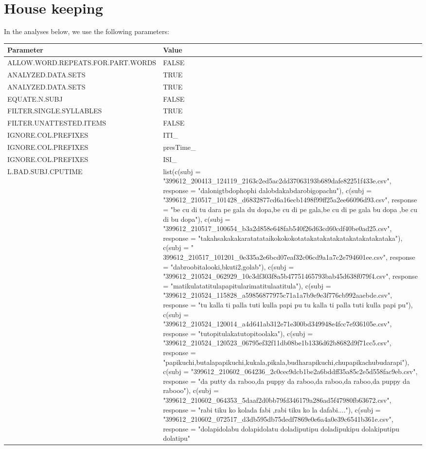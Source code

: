 \documentclass[
]{article}
\begin{document}
\section{House keeping}\label{house-keeping}

In the analyses below, we use the following parameters:

\begin{longtable}[t]{>{\raggedright\arraybackslash}p{20em}>{\raggedright\arraybackslash}p{30em}}
\toprule
Parameter & Value\\
\midrule
ALLOW.WORD.REPEATS.FOR.PART.WORDS & FALSE\\
ANALYZED.DATA.SETS & \vphantom{1} TRUE\\
ANALYZED.DATA.SETS & TRUE\\
EQUATE.N.SUBJ & FALSE\\
FILTER.SINGLE.SYLLABLES & TRUE\\
\addlinespace
FILTER.UNATTESTED.ITEMS & FALSE\\
IGNORE.COL.PREFIXES & ITI\_\\
IGNORE.COL.PREFIXES & presTime\_\\
IGNORE.COL.PREFIXES & ISI\_\\
L.BAD.SUBJ.CPUTIME & list(c(subj = "399612\_200413\_124119\_2163c2ed5ac2dd37063193b689dafe82251f433e.csv", response = "dalonigtbdophophi dalobdakabdarobigopachu"), c(subj = "399612\_210517\_101428\_d6832877cd6a16ecb1498f99ff25a2ee66096d93.csv", response = "be cu di tu dara pe gala du dopa,be cu di pe gala,be cu di pe gala bu dopa ,be cu di bu dopa"), c(subj = "399612\_210517\_100654\_b3a2d858e648fab540f26d63cd60cdf40be0ad25.csv", response = "takahsakakakaratatataikokokokotatakatakatakatakatakatakataka"), c(subj = " 399612\_210517\_101201\_0e335a2e6bcd07eaf32c06cd9a1a7c2e794601ee.csv", 
response = "dabroobitalooki,bkuti2,golab"), c(subj = "399612\_210524\_062929\_10c3df303f8a5b47751465793bab45d638f079f4.csv", response = "matikulatatitulapapitularimatitulaatitula"), c(subj = "399612\_210524\_115828\_a59856877975c71a1a7b9e9e3f776cb992aaebde.csv", response = "tu kalla ti palla tuti kulla papi pu tu kalla ti palla tuti kulla papi pu"), c(subj = "399612\_210524\_120014\_a4d641ab312e71e300bd349948e4fcc7e936105e.csv", response = "tutopitulakatutopitoolaka"), c(subj = "399612\_210524\_120523\_06795ef32f11db08be1b1336d62b8682d9f71cc5.csv", 
response = "papikuchi,butalapapikuchi,kukala,pikala,budharapikuchi,chupapikachubudarapi"), c(subj = "399612\_210602\_064236\_2c0cec9dcb1be2a6bddff35a85c2e5d558fac9eb.csv", response = "da putty da raboo,da puppy da raboo,da raboo,da raboo,da puppy da rabooo"), c(subj = "399612\_210602\_064353\_5daaf2d0bb79fd346179a286ad5f47980fb63672.csv", response = "rabi tiku ko kolada fabi ,rabi tiku ko la dafabi...."), c(subj = "399612\_210602\_072517\_d3db595db75dedf7869e0e6a4a0e39c6541b361e.csv", response = "dolapidolabu dolapidolatu doladiputipu doladipukipu dolakiputipu dolatipu"

\end{longtable}
\end{document}
